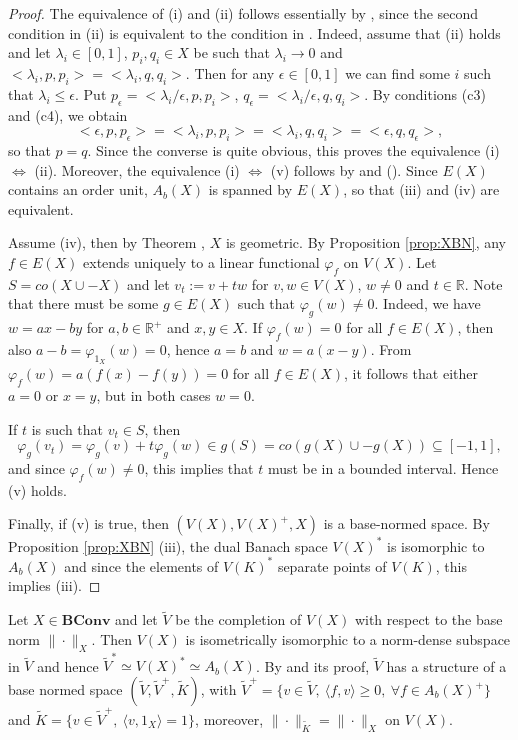 \documentclass[12pt,letterpaper]{article}
\newcommand{\ct}[1]{\mathbf{#1}}
\newcommand{\<}{\langle}
\def\>{\rangle}
\begin{document}
\begin{proof} The equivalence of (i) and (ii) follows essentially by \cite[Thms. 1.3 and 2.2]{convex}, since the second condition in (ii) is equivalent to  the condition in \cite[Thm. 2.2]{convex}. Indeed,  assume that (ii) holds and let $\lambda_i\in [0,1]$, $p_i,q_i\in X$ be such that $\lambda_i\to 0$ and $<\lambda_i,p,p_i>=<\lambda_i,q,q_i>$. Then for any $\epsilon\in [0,1]$ we can find some $i$ such that $\lambda_i\le \epsilon$. Put $p_\epsilon=<\lambda_i/\epsilon,p,p_i>$, $q_\epsilon=<\lambda_i/\epsilon,q,q_i>$. By conditions (c3) and (c4), we obtain 
\[
<\epsilon,p,p_\epsilon>=< \lambda_i,p,p_i>=<\lambda_i,q,q_i>=<\epsilon, q, q_\epsilon>,
\]
so that $p=q$. Since the converse is quite obvious, this proves the equivalence (i) $\iff$ (ii). Moreover, the equivalence (i) $\iff$ (v) follows by \cite[Thm. 2.5]{convex}  and \cite{ellis} (\cite[Prop. 5]{ovs}).  
Since $E(X)$ contains an order unit, $A_b(X)$ is spanned by $E(X)$, so that (iii) and (iv) are equivalent. 

Assume (iv), then by Theorem \cite[Thm. 1.2]{convex}, $X$ is geometric. By Proposition \ref{prop:XBN}, any $f\in E(X)$ extends uniquely to a linear functional $\varphi_f$ on $V(X)$. Let $S=co(X\cup -X)$ and let $v_t:=v+tw$ for $v,w\in V(X)$, $w\ne 0$ and $t\in \mathbb R$. 
Note that there must be some $g\in E(X)$ such that $\varphi_g(w)\ne0$. Indeed, we have $w=ax-by$ for $a,b\in \mathbb R^+$ and $x,y\in X$. If $\varphi_f(w)=0$ for all $f\in E(X)$, 
 then also $a-b=\varphi_{1_X}(w)=0$, hence $a=b$ and $w=a(x-y)$. From $\varphi_f(w)=a(f(x)-f(y))=0$ for all $f\in E(X)$, it follows that either $a=0$ or $x=y$, but in both cases $w=0$. 
 
If $t$ is such that  $v_t\in S$, then 
  \[
  \varphi_g(v_t)=\varphi_g(v)+t\varphi_g(w)\in g(S)=co(g(X)\cup -g(X))\subseteq [-1,1],
  \]
   and since $\varphi_f(w)\ne 0$, this implies that $t$ must be in a bounded interval. Hence (v) holds. 

Finally, if (v) is true, then $(V(X), V(X)^+, X)$ is a base-normed space. By Proposition \ref{prop:XBN} (iii), the dual Banach space 
$V(X)^*$ is isomorphic to $A_b(X)$ and since the elements of $V(K)^*$ separate points of $V(K)$, this implies (iii).


\end{proof}



Let $X\in \ct{BConv}$ and let $\tilde V$ be the completion of $V(X)$ with respect to the base norm $\|\cdot\|_X$. Then $V(X)$ is isometrically isomorphic to a norm-dense subspace in $\tilde V$ and hence 
$\tilde V^*\simeq V(X)^*\simeq A_b(X)$. By \cite[Theorem ]{ovs} and its proof, $\tilde V$ has a structure of a base normed space
$(\tilde V,\tilde V^+,\tilde K)$,
 with $\tilde V^+=\{ v\in \tilde V,\ \<f,v\>\ge 0,\ \forall f\in A_b(X)^+\}$ and $\tilde K= \{v\in \tilde V^+,\ \<v,1_X\>=1\}$, moreover, $\|\cdot\|_{\tilde K}=\|\cdot\|_X$ on $V(X)$. 
\end{document}
